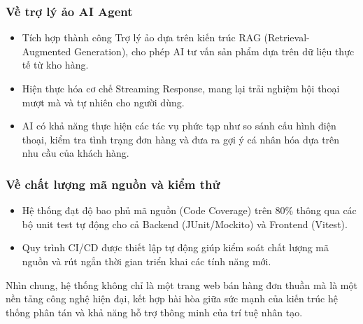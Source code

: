 \subsubsection{Về trợ lý ảo AI Agent}
\begin{itemize}
    \item Tích hợp thành công Trợ lý ảo dựa trên kiến trúc RAG (Retrieval-Augmented Generation), cho phép AI tư vấn sản phẩm dựa trên dữ liệu thực tế từ kho hàng.
    \item Hiện thực hóa cơ chế Streaming Response, mang lại trải nghiệm hội thoại mượt mà và tự nhiên cho người dùng.
    \item AI có khả năng thực hiện các tác vụ phức tạp như so sánh cấu hình điện thoại, kiểm tra tình trạng đơn hàng và đưa ra gợi ý cá nhân hóa dựa trên nhu cầu của khách hàng.
\end{itemize}

\subsubsection{Về chất lượng mã nguồn và kiểm thử}
\begin{itemize}
    \item Hệ thống đạt độ bao phủ mã nguồn (Code Coverage) trên 80\% thông qua các bộ unit test tự động cho cả Backend (JUnit/Mockito) và Frontend (Vitest).
    \item Quy trình CI/CD được thiết lập tự động giúp kiểm soát chất lượng mã nguồn và rút ngắn thời gian triển khai các tính năng mới.
\end{itemize}

\vspace{10pt}
Nhìn chung, hệ thống không chỉ là một trang web bán hàng đơn thuần mà là một nền tảng công nghệ hiện đại, kết hợp hài hòa giữa sức mạnh của kiến trúc hệ thống phân tán và khả năng hỗ trợ thông minh của trí tuệ nhân tạo.
